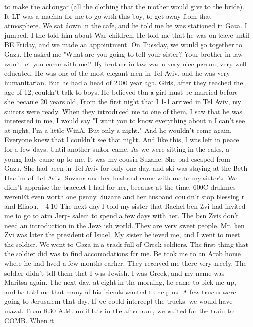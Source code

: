to make the achougar (all the clothing that the mother would give to the bride). It LT 
was a machia for me to go with this boy, to get away from that atmosphere. 
We sat down in the cafe, and he told me he was stationed in Gaza. I jumped. I 
the 
told him about War children. He told me that he was on leave until BE Friday, and we 
made an appointment. On Tuesday, we would go together to Gaza. He asked me "What are 
you going to tell your sister? Your brother-in-law won't let you come with me!" Ify 
brother-in-law was a very nice person, very well educated. He was one of the most 
elegant men in Tel Aviv, and he was very humanitarian. But he had a head of 2000 year 
ago. Girls, after they reached the age of 12, couldn't talk to boys. He believed tbn 
a girl must be married before she became 20 years old, From the first night that I 1-1 
arrived in Tel Aviv, my suitors were ready. When they introduced me to one of them, 
I saw that he was interested in me, I would say "I want you to know everything about n 
I can't see at night, I'm a little WinA. But only a night." And he wouldn't come 
again. Everyone knew that I couldn't see that night. And like this, I was left in 
peace for a few days. Until another suitor came. 
As we were sitting in the cafes, a young lady came up to me. It was my cousin 
Suzane. She bad escaped from Gaza. She had been in Tel Aviv for only one day, and ski 
was staying at the Beth Haolim of Tel Aviv. Suzane and her husband came with me to 
my sister's. We didn't appraise the bracelet I had for her, because at the time, 600C 
drakmes werenEt even worth one penny. Suzane and her husband couldn't stop blessing r 
and Eliaou. 
- 4 
10 
The next day I told my sister that Rachel ben Zvi had invited me to go to atm Jerp-
salem to spend a few days with her. The ben Zvis don't need an introduction in the Jew-
ish world. They are very sweet people. Mr. ben Zvi was later the president of Israel. 
My sister believed me, and I went to meet the soldier. 
We went to Gaza in a track full of Greek soldiers. The first thing that the soldier 
did was to find accomodations for me. Be took me to an Arab home where he had lived a 
few months earlier. They received me there very nicely. The soldier didn't tell them 
that I was Jewish. I was Greek, and my name was Maritsa again. The next day, at eight in 
the morning, he came to pick me up, and he told me that many of his friends wanted to help 
us. A few trucks were going to Jerusalem that day. If we could intercept the trucks, we 
would have mazal. 
From 8:30 A.M. until late in the afternoon, we waited for the train to COMB. When it 

